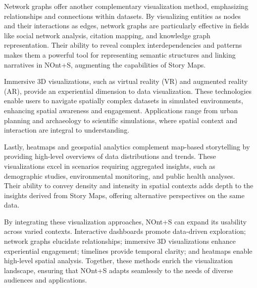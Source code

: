 Network graphs offer another complementary visualization method, emphasizing relationships and connections within datasets. By visualizing entities as nodes and their interactions as edges, network graphs are particularly effective in fields like social network analysis, citation mapping, and knowledge graph representation. Their ability to reveal complex interdependencies and patterns makes them a powerful tool for representing semantic structures and linking narratives in NOnt+S, augmenting the capabilities of Story Maps.

Immersive 3D visualizations, such as virtual reality (VR) and augmented reality (AR), provide an experiential dimension to data visualization. These technologies enable users to navigate spatially complex datasets in simulated environments, enhancing spatial awareness and engagement. Applications range from urban planning and archaeology to scientific simulations, where spatial context and interaction are integral to understanding.


Lastly, heatmaps and geospatial analytics complement map-based storytelling by providing high-level overviews of data distributions and trends. These visualizations excel in scenarios requiring aggregated insights, such as demographic studies, environmental monitoring, and public health analyses. Their ability to convey density and intensity in spatial contexts adds depth to the insights derived from Story Maps, offering alternative perspectives on the same data.

By integrating these visualization approaches, NOnt+S can expand its usability across varied contexts. Interactive dashboards promote data-driven exploration; network graphs elucidate relationships; immersive 3D visualizations enhance experiential engagement; timelines provide temporal clarity; and heatmaps enable high-level spatial analysis. Together, these methods enrich the visualization landscape, ensuring that NOnt+S adapts seamlessly to the needs of diverse audiences and applications.




